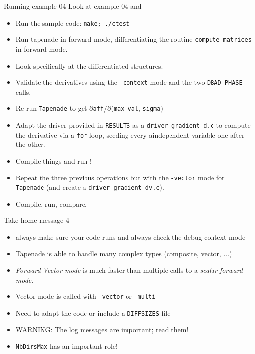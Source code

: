 \documentclass[12pt,xcolor={table}]{beamer}
\begin{document}
\begin{frame}{Running example 04}
  Look at example 04 and 
  \begin{itemize}
    \item Run the sample code: \texttt{make; ./ctest}%
    \item Run tapenade in forward mode, differentiating the routine \texttt{compute\_matrices} in forward mode.
    \item Look specifically at the differentiated structures.
    \item Validate the derivatives using the \texttt{-context} mode and the two \texttt{DBAD\_PHASE} calls.
    \item Re-run \texttt{Tapenade} to get $\partial$\texttt{aff}/$\partial$(\texttt{max\_val}, \texttt{sigma}) 
    \item Adapt the driver provided in \texttt{RESULTS} as a \texttt{driver\_gradient\_d.c} to compute the derivative via a \texttt{for} loop, seeding every aindependent variable one after the other.
    \item Compile things and run !%
    \item Repeat the three previous operations but with the \texttt{-vector} mode for \texttt{Tapenade} (and create a \texttt{driver\_gradient\_dv.c}).
    \item Compile, run, compare.
  \end{itemize}
\end{frame}

\begin{frame}{Take-home message 4}
  \begin{itemize}
    \item always make sure your code runs and always check the debug context mode
    \item Tapenade is able to handle many complex types (composite, vector, ...)
    \item \emph{Forward Vector mode} is \alert{much faster} than multiple calls to a \emph{scalar forward mode}.
    \item Vector mode is called with \texttt{-vector} or \texttt{-multi}
    \item Need to adapt the code or include a \texttt{DIFFSIZES} file
    \item WARNING: The log messages are important; read them!
    \item \texttt{NbDirsMax} has an important role!
  \end{itemize}
\end{frame}
\end{document}
